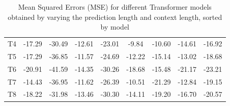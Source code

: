 \begin{table}[]
{\begin{tabular}{
    >{\columncolor[HTML]{FFFFFF}}c cccccccc}
    T4    & \cellcolor[HTML]{FDBD7C}-17.29   & \cellcolor[HTML]{F8696B}-30.49              & \cellcolor[HTML]{FCB279}-12.61 & \cellcolor[HTML]{F97A6F}-23.01       & \cellcolor[HTML]{F8696B}-9.84             & \cellcolor[HTML]{F8696B}-10.60           & \cellcolor[HTML]{FB9975}-14.61      & \cellcolor[HTML]{F8696B}-16.92 \\
    T5    & \cellcolor[HTML]{FDBD7B}-17.29   & \cellcolor[HTML]{FFEB84}-36.85              & \cellcolor[HTML]{F8696B}-11.57 & \cellcolor[HTML]{FCAA78}-24.69       & \cellcolor[HTML]{FCB079}-12.22            & \cellcolor[HTML]{FCAD79}-15.14           & \cellcolor[HTML]{F96E6C}-13.02      & \cellcolor[HTML]{FB9C75}-18.68 \\
    T6    & \cellcolor[HTML]{6BC07B}-20.91   & \cellcolor[HTML]{83C77C}-41.59              & \cellcolor[HTML]{F1E783}-14.35 & \cellcolor[HTML]{64BE7B}-30.26       & \cellcolor[HTML]{97CD7E}-18.68            & \cellcolor[HTML]{FCB27A}-15.48           & \cellcolor[HTML]{8AC97D}-21.17      & \cellcolor[HTML]{ADD37F}-23.21 \\
    T7    & \cellcolor[HTML]{F8696B}-14.43   & \cellcolor[HTML]{FDEA83}-36.95              & \cellcolor[HTML]{F96D6C}-11.62 & \cellcolor[HTML]{FFDC81}-26.39       & \cellcolor[HTML]{FA7D6F}-10.51            & \cellcolor[HTML]{C5DA80}-21.29           & \cellcolor[HTML]{F8696B}-12.84      & \cellcolor[HTML]{FCA978}-19.15 \\
    T8    & \cellcolor[HTML]{FED881}-18.22   & \cellcolor[HTML]{FA8871}-31.98              & \cellcolor[HTML]{FEEA83}-13.46 & \cellcolor[HTML]{63BE7B}-30.30       & \cellcolor[HTML]{FFE784}-14.11            & \cellcolor[HTML]{FFEA84}-19.20           & \cellcolor[HTML]{FED17F}-16.70      & \cellcolor[HTML]{FED280}-20.57
    \end{tabular}%
    }
    \caption{Mean Squared Errors (MSE) for different Transformer models obtained by varying the prediction length and context length, sorted by model}
    \label{T1_M}
    \end{table}


